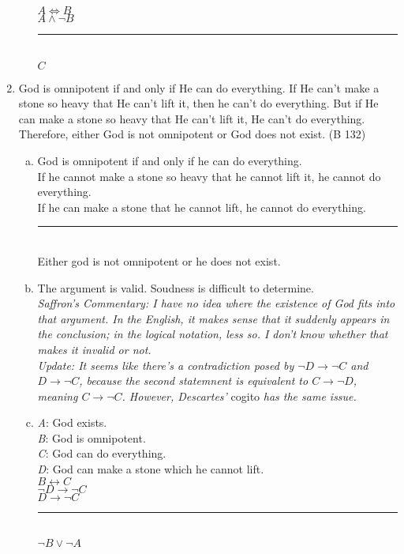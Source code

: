 \documentclass{article}
\begin{document}
\begin{enumerate}
\begin{enumerate}[(a)]
                    $A \iff B$\\
                    $A \land \neg B$\\
                    \rule{5em}{.5pt}\\
                    $C$
          \end{enumerate}
    \item God is omnipotent if and only if He can do everything. If He can't make a stone so heavy that He can't lift it, then he can't do everything. But if He can make a stone so heavy that He can't lift it, He can't do everything. Therefore, either God is not omnipotent or God does not exist. (B 132)
          \begin{enumerate}[(a)]
              \item God is omnipotent if and only if he can do everything.\\
                    If he cannot make a stone so heavy that he cannot lift it, he cannot do everything.\\
                    If he can make a stone that he cannot lift, he cannot do everything.\\
                    \rule{15em}{.5pt}\\
                    Either god is not omnipotent or he does not exist.
              \item The argument is valid. Soudness is difficult to determine.\\
                    \textit{Saffron's Commentary: I have no idea where the existence of God fits into that argument. In the English, it makes sense that it suddenly appears in the conclusion; in the logical notation, less so. I don't know whether that makes it invalid or not.\\
                    Update: It seems like there's a contradiction posed by $\neg D \to \neg C$ and $D \to \neg C$, because the second statemnent is equivalent to $C \to \neg D$, meaning $C \to \neg C$. However, Descartes'} cogito \textit{has the same issue.}
              \item \textit{A}: God exists.\\
                    \textit{B}: God is omnipotent.\\
                    \textit{C}: God can do everything.\\
                    \textit{D}: God can make a stone which he cannot lift.\\

                    $B \leftrightarrow C$\\
                    $\neg D \to \neg C$\\
                    $D \to \neg C$\\
                    \rule{5em}{.5pt}\\
                    $\neg B \lor \neg A$
          \end{enumerate}
\end{enumerate}
\end{document}
